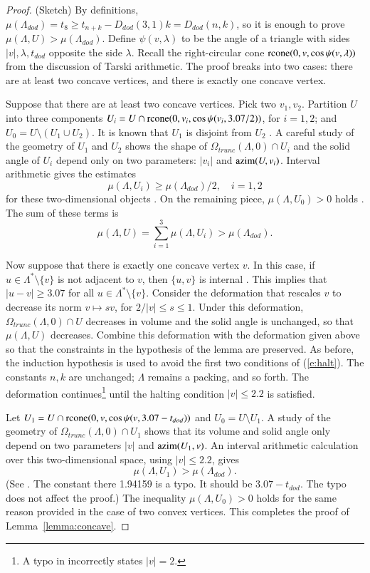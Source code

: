 \begin{proof} (Sketch)  By definitions,
$\mu(\Lambda_{dod}) = t_8 \ge t_{n+k} - D_{dod}(3,1)k = D_{dod}(n,k)$, so it is
enough to prove $\mu(\Lambda,U) > \mu(\Lambda_{dod})$. 
Define $\psi(v,\lambda)$ to be the angle of a triangle with sides $|v|,\lambda,t_{dod}$
opposite the side $\lambda$.  Recall the right-circular cone 
${\operatorname{rcone}}(0,v,\cos\psi(v,\lambda))$ from the discussion of Tarski arithmetic.
The proof breaks into two
cases: there are at least two concave vertices, and there is exactly one concave vertex.

Suppose that there are at least two concave vertices.  Pick two $v_1,v_2$.
Partition $U$ into three
components $U_i = U\cap {\operatorname{rcone}}(0,v_i,\cos\psi(v_i,3.07/2))$, for $i=1,2$; and
$U_0= U\setminus (U_1\cup U_2)$.  It is known that
$U_1$ is disjoint from $U_2$ \cite[Lemma~3.7]{arx}.   A careful study of the geometry
of $U_1$ and $U_2$ shows the shape of $\Omega_{trunc}(\Lambda,0)\cap U_i$ and the
solid angle of $U_i$ depend only
on two parameters: $|v_i|$ and ${\operatorname{azim}}(U,v_i)$.  Interval arithmetic gives
the estimates
  $$\mu(\Lambda,U_i) \ge \mu(\Lambda_{dod})/2,\quad i=1,2$$
for these two-dimensional objects \cite[\S7.2.6]{arx}.  On the remaining piece, $\mu(\Lambda,U_0)>0$ holds
\cite[p.138]{DCG}.  The sum of these terms is
  $$
  \mu(\Lambda,U) = \sum_{i=1}^3 \mu(\Lambda,U_i) > \mu(\Lambda_{dod}).
  $$

Now suppose that there is exactly one concave vertex $v$.  In this case, if $u\in\Lambda^*\setminus\{v\}$
is not adjacent to $v$, then $\{u,v\}$ is internal \cite[p.140]{DCG}.  This implies
that $|u-v|\ge 3.07$ for all $u\in\Lambda^*\setminus\{v\}$.
Consider the deformation that rescales $v$ to decrease its norm $v\mapsto s v$, for 
$2/|v|\le s\le 1$. Under this deformation, $\Omega_{trunc}(\Lambda,0)\cap U$ decreases
in volume and the solid angle is unchanged, so that $\mu(\Lambda,U)$ decreases.
Combine this deformation with the deformation given above so that the
constraints in the hypothesis of the lemma are preserved.  As before, the induction
hypothesis is used to avoid the first two conditions of (\ref{e:halt}).
The constants $n,k$ are unchanged; $\Lambda$ remains a packing, and so forth.
The deformation continues\footnote{A typo in \cite{arx}  incorrectly states $|v|=2$.} until the halting condition $|v|\le 2.2$ is satisfied. 

Let $U_1 = U\cap {\operatorname{rcone}}(0,v,\cos\psi(v,3.07-t_{dod}))$ and $U_0 = U
\setminus U_1$.  A study of the geometry of $\Omega_{trunc}(\Lambda,0)
\cap U_1$ shows that its volume and solid angle only depend 
on two parameters $|v|$ and
${\operatorname{azim}}(U_1,v)$.  An interval arithmetic calculation over this
two-dimensional space, using $|v|\le 2.2$, gives
$$
\mu(\Lambda,U_1) > \mu(\Lambda_{dod}).
$$
(See \cite[\S7.2.6]{arx}. The constant there 1.94159 is a typo.
It should be $3.07-t_{dod}$.  The typo does not affect the proof.)
The inequality $\mu(\Lambda,U_0)>0$ holds for the same reason provided
in the case of two convex vertices.  This completes
the proof of Lemma~\ref{lemma:concave}.
\end{proof}


